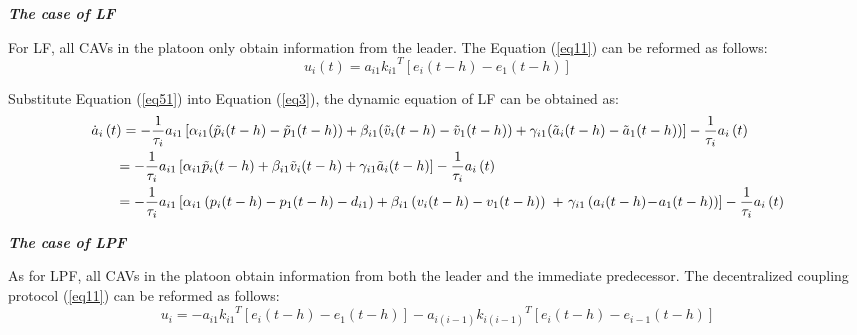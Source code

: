 \documentclass[a4paper]{cas-sc}
\begin{document}
\textbf{\emph{The case of LF}}

For LF, all CAVs in the platoon only obtain information from the leader. The Equation (\ref{eq11}) can be reformed as follows:
\begin{equation}
  {u_i}(t) = {a_{i1}}{k_{i1}}^T\left[ {{e_i}(t - h) - {e_1}(t - h)} \right]
  \label{eq51}
\end{equation}

Substitute Equation (\ref{eq51}) into Equation (\ref{eq3}), the dynamic equation of LF can be obtained as:
\begin{equation}
  \begin{gathered}
    {{\dot a}_i}\left( t \right) =  - \frac{1}{{{\tau _i}}}{a_{i1}}\left[ {{\alpha _{i1}}({{\tilde p}_i}(t - h) - {{\tilde p}_1}(t - h)) + {\beta _{i1}}({{\tilde v}_i}(t - h) - {{\tilde v}_1}(t - h)) + {\gamma _{i1}}({{\tilde a}_i}(t - h) - {{\tilde a}_1}(t - h))} \right] - \frac{1}{{{\tau _i}}}{a_i}\left( t \right) \hfill \\
    \quad \quad  =  - \frac{1}{{{\tau _i}}}{a_{i1}}\left[ {{\alpha _{i1}}{{\tilde p}_i}(t - h) + {\beta _{i1}}{{\tilde v}_i}(t - h) + {\gamma _{i1}}{{\tilde a}_i}(t - h)} \right] - \frac{1}{{{\tau _i}}}{a_i}\left( t \right) \hfill \\
    \quad \quad  =  - \frac{1}{{{\tau _i}}}{a_{i1}}\left[ {{\alpha _{i1}}\left( {{p_i}(t - h) - {p_1}(t - h) - {d_{i1}}} \right) + {\beta _{i1}}\left( {{v_i}(t - h) - {v_1}(t - h)} \right){\text{ + }}{\gamma _{i1}}\left( {{a_i}(t - h) \!-\! {a_1}(t - h)} \right)} \right] - \frac{1}{{{\tau _i}}}{a_i}\left( t \right) \hfill \\
  \end{gathered}
  \label{eq52}
\end{equation}

\textbf{\emph{The case of LPF}}

As for LPF, all CAVs in the platoon obtain information from both the leader and the immediate predecessor. The decentralized coupling protocol (\ref{eq11}) can be reformed as follows:
\begin{equation}
  {u_i} =  - {a_{i1}}{k_{i1}}^T\left[ {{e_i}(t - h) - {e_1}(t - h)} \right] - {a_{i(i - 1)}}{k_{i(i - 1)}}^T\left[ {{e_i}(t - h) - {e_{i - 1}}(t - h)} \right]
  \label{eq53}
\end{equation}
\end{document}
